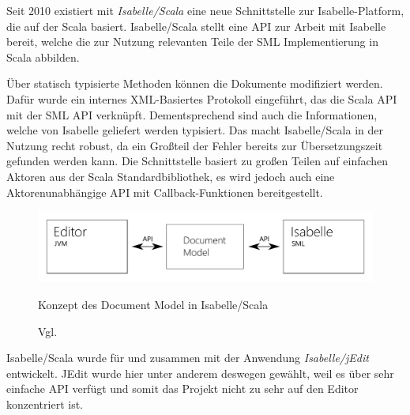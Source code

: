 Seit 2010 existiert mit \textit{Isabelle/Scala} eine neue Schnittstelle zur Isabelle-Platform, die
auf der Scala basiert. Isabelle/Scala stellt eine API zur Arbeit mit Isabelle bereit, welche die zur
Nutzung relevanten Teile der SML Implementierung in Scala abbilden. \cite{iscala}

Über statisch typisierte Methoden können die Dokumente modifiziert werden. Dafür wurde ein internes
XML-Basiertes Protokoll eingeführt, das die Scala API mit der SML API verknüpft. Dementsprechend
sind auch die Informationen, welche von Isabelle geliefert werden typisiert. Das macht
Isabelle/Scala in der Nutzung recht robust, da ein Großteil der Fehler bereits zur Übersetzungszeit
gefunden werden kann. Die Schnittstelle basiert zu großen Teilen auf einfachen Aktoren aus der Scala
Standardbibliothek, es wird jedoch auch eine Aktorenunabhängige API mit Callback-Funktionen
bereitgestellt.

\begin{figure}[ht]
\includegraphics[width=\linewidth]{images/diagram-iscala}
  \caption{Konzept des Document Model in Isabelle/Scala}
  \caption*{Vgl. \cite{iscala}}
  \label{fig:diagram-iscala}
\end{figure}

Isabelle/Scala wurde für und zusammen mit der Anwendung \textit{Isabelle/jEdit} entwickelt. JEdit
wurde hier unter anderem deswegen gewählt, weil es über sehr einfache API verfügt und somit das
Projekt nicht zu sehr auf den Editor konzentriert ist.

